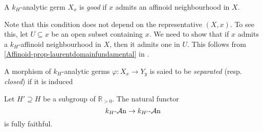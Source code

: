 \begin{definition}
    A $k_H$-analytic germ $X_x$ is \emph{good} if $x$ admits an affinoid neighbourhood in $X$.
\end{definition}
Note that this condition does not depend on the representative $(X,x)$. To see this, let $U\subseteq x$ be an open subset containing $x$. We need to show that if $x$ admits a $k_H$-affinoid neighbourhood in $X$, then it admits one in $U$. This follows from \cref{Affinoid-prop-laurentdomainfundamental} in .

\begin{definition}
    A morphism of $k_H$-analytic germs $\varphi:X_x\rightarrow Y_y$ is saied to be \emph{separated} (resp. \emph{closed}) if it is induced
\end{definition}

\begin{thm}
    Let $H'\supseteq H$ be a subgroup of $\mathbb{R}_{>0}$. The natural functor
    \[
        k_H\text{-}\mathcal{A}\mathrm{n} \rightarrow k_{H'}\text{-}\mathcal{A}\mathrm{n}
    \]
    is fully faithful.
\end{thm}

\printbibliography
